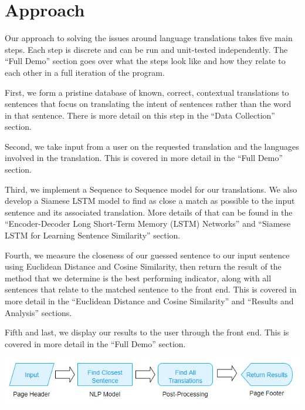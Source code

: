 \documentclass[runningheads]{llncs}
\begin{document}
	
	\section{Approach}
	Our approach to solving the issues around language translations takes five main steps. Each step is discrete and can be run and unit-tested independently. The ``Full Demo'' section goes over what the steps look like and how they relate to each other in a full iteration of the program. 
	
	First, we form a pristine database of known, correct, contextual translations to sentences that focus on translating the intent of sentences rather than the word in that sentence. There is more detail on this step in the ``Data Collection'' section. 
	
	Second, we take input from a user on the requested translation and the languages involved in the translation. This is covered in more detail in the ``Full Demo'' section. 
	
	Third, we  implement a Sequence to Sequence model for our translations. We also develop a Siamese LSTM model to find as close a match as possible to the input sentence and its associated translation.  More details of that can be found in the  ``Encoder-Decoder Long Short-Term Memory (LSTM) Networks''  and ``Siamese LSTM for Learning Sentence Similarity'' section. 
	
	Fourth, we measure the closeness of our guessed sentence to our input sentence using Euclidean Distance and Cosine Similarity, then return the result of the method that we determine is the best performing indicator, along with all sentences that relate to the matched sentence to the front end. This is covered in more detail in the ``Euclidean Distance and Cosine Similarity'' and ``Results and Analysis'' sections.
	
	Fifth and last, we display our results to the user through the front end. This is covered in more detail in the ``Full Demo'' section.


	\begin{minipage}{\linewidth}
		\begin{center}
			\hspace*{-.3in}
			\hspace*{-.3in}
			\includegraphics[width=\textwidth]{Process_Map.png}
			\label{fig:Process Map}
			\vspace*{1cm}
		\end{center}
	\end{minipage}
	\afterpage{\clearpage}
	
\end{document}

